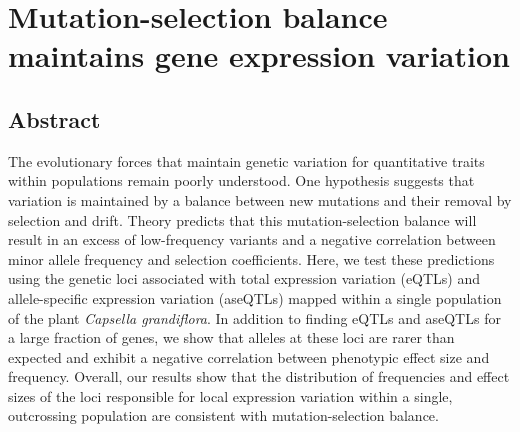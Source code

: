 \setlength{\parindent}{0ex}
\setlength{\parskip}{2ex}

\chapter{Mutation-selection balance maintains gene expression variation}

\section{Abstract}
The evolutionary forces that maintain genetic variation for quantitative traits within populations remain poorly understood. One hypothesis suggests that variation is maintained by a balance between new mutations and their removal by selection and drift. Theory predicts that this mutation-selection balance will result in an excess of low-frequency variants and a negative correlation between minor allele frequency and selection coefficients. Here, we test these predictions using the genetic loci associated with total expression variation (eQTLs) and allele-specific expression variation (aseQTLs) mapped within a single population of the plant \textit{Capsella grandiflora}. In addition to finding eQTLs and aseQTLs for a large fraction of genes, we show that alleles at these loci are rarer than expected and exhibit a negative correlation between phenotypic effect size and frequency. Overall, our results show that the distribution of frequencies and effect sizes of the loci responsible for local expression variation within a single, outcrossing population are consistent with mutation-selection balance.

